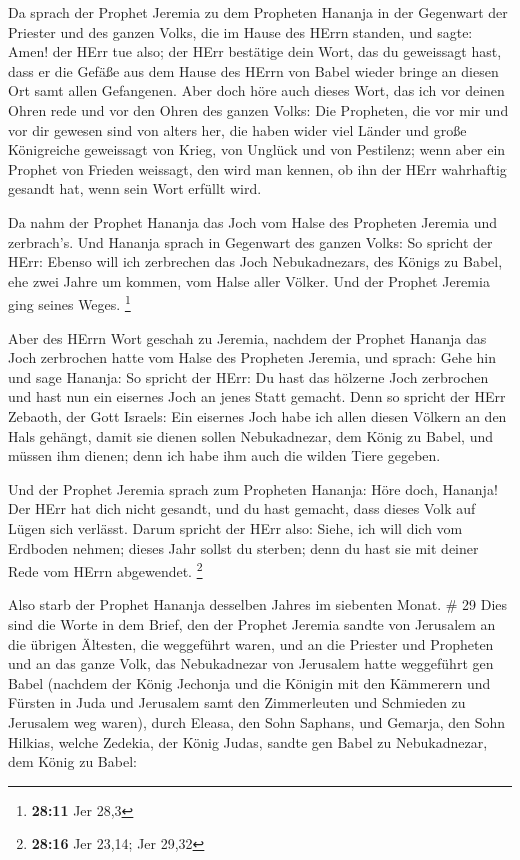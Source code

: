 Da sprach der Prophet Jeremia zu dem Propheten Hananja in
der Gegenwart der Priester und des ganzen Volks, die im Hause des HErrn
standen,  und sagte: Amen! der HErr tue also; der HErr
bestätige dein Wort, das du geweissagt hast, dass er die Gefäße aus dem
Hause des HErrn von Babel wieder bringe an diesen Ort samt allen
Gefangenen.  Aber doch höre auch dieses Wort, das ich vor
deinen Ohren rede und vor den Ohren des ganzen Volks:  Die
Propheten, die vor mir und vor dir gewesen sind von alters her, die
haben wider viel Länder und große Königreiche geweissagt von Krieg, von
Unglück und von Pestilenz;  wenn aber ein Prophet von
Frieden weissagt, den wird man kennen, ob ihn der HErr wahrhaftig
gesandt hat, wenn sein Wort erfüllt wird.

 Da nahm der Prophet Hananja das Joch vom Halse des
Propheten Jeremia und zerbrach's.  Und Hananja sprach in
Gegenwart des ganzen Volks: So spricht der HErr: Ebenso will ich
zerbrechen das Joch Nebukadnezars, des Königs zu Babel, ehe zwei Jahre
um kommen, vom Halse aller Völker. Und der Prophet Jeremia ging seines
Weges. \footnote{\textbf{28:11} Jer 28,3}

 Aber des HErrn Wort geschah zu Jeremia, nachdem der
Prophet Hananja das Joch zerbrochen hatte vom Halse des Propheten
Jeremia, und sprach:  Gehe hin und sage Hananja: So spricht
der HErr: Du hast das hölzerne Joch zerbrochen und hast nun ein eisernes
Joch an jenes Statt gemacht.  Denn so spricht der HErr
Zebaoth, der Gott Israels: Ein eisernes Joch habe ich allen diesen
Völkern an den Hals gehängt, damit sie dienen sollen Nebukadnezar, dem
König zu Babel, und müssen ihm dienen; denn ich habe ihm auch die wilden
Tiere gegeben.

 Und der Prophet Jeremia sprach zum Propheten Hananja: Höre
doch, Hananja! Der HErr hat dich nicht gesandt, und du hast gemacht,
dass dieses Volk auf Lügen sich verlässt.  Darum spricht
der HErr also: Siehe, ich will dich vom Erdboden nehmen; dieses Jahr
sollst du sterben; denn du hast sie mit deiner Rede vom HErrn
abgewendet. \footnote{\textbf{28:16} Jer 23,14; Jer 29,32}

 Also starb der Prophet Hananja desselben Jahres im
siebenten Monat. \# 29  Dies sind die Worte in dem Brief,
den der Prophet Jeremia sandte von Jerusalem an die übrigen Ältesten,
die weggeführt waren, und an die Priester und Propheten und an das ganze
Volk, das Nebukadnezar von Jerusalem hatte weggeführt gen Babel
 (nachdem der König Jechonja und die Königin mit den
Kämmerern und Fürsten in Juda und Jerusalem samt den Zimmerleuten und
Schmieden zu Jerusalem weg waren),  durch Eleasa, den Sohn
Saphans, und Gemarja, den Sohn Hilkias, welche Zedekia, der König Judas,
sandte gen Babel zu Nebukadnezar, dem König zu Babel:

